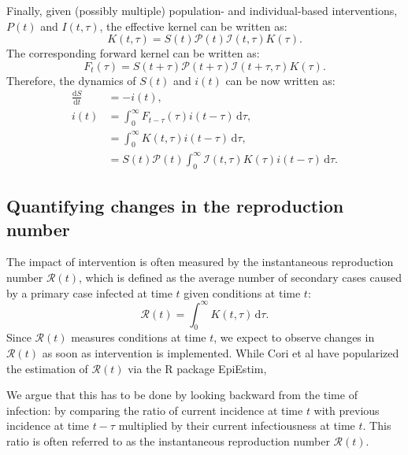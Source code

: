 \documentclass[12pt]{article}
\newcommand{\RR}{\ensuremath{{\mathcal R}}\xspace}
\newcommand{\dd}[1]{\ensuremath{\, \mathrm{d}#1}}
\newcommand{\dtau}{\dd{\tau}}
\newcommand{\PP}{{\mathcal P}}
\newcommand{\II}{{\mathcal I}}
\begin{document}
Finally, given (possibly multiple) population- and individual-based interventions, $P(t)$ and $I(t, \tau)$, the effective kernel can be written as:
\begin{equation}
K(t, \tau) = S(t) \PP(t) \II(t,\tau) K(\tau).
\end{equation}
The corresponding forward kernel can be written as:
\begin{equation}
F_t(\tau) = S(t+\tau) \PP(t + \tau) \II(t+\tau, \tau) K(\tau).
\end{equation}
Therefore, the dynamics of $S(t)$ and $i(t)$ can be now written as:
\begin{equation}
\begin{aligned}
\frac{\mathrm{d}S}{\mathrm{d}t} &= - i(t),\\
i(t) &= \int_0^\infty F_{t-\tau}(\tau) i(t-\tau) \dtau,\\
&=\int_0^\infty  K(t,\tau) i(t-\tau)\dtau,\\
&= S(t) \PP(t) \int_0^\infty \II(t, \tau) K(\tau) i(t-\tau)\dtau.
\end{aligned}
\end{equation}

\subsection{Quantifying changes in the reproduction number}

The impact of intervention is often measured by the instantaneous reproduction number $\RR(t)$, which is defined as the average number of secondary cases caused by a primary case infected at time $t$ given conditions at time $t$:
\begin{equation}
\RR(t) = \int_0^\infty K(t, \tau) \dtau.
\end{equation}
Since $\RR(t)$ measures conditions at time $t$, we expect to observe changes in $\RR(t)$ as soon as intervention is implemented.
While Cori et al have popularized the estimation of $\RR(t)$ via the R package EpiEstim, 


We argue that this has to be done by looking backward from the time of infection: by comparing the ratio of current incidence at time $t$ with previous incidence at time $t-\tau$ multiplied by their current infectiousness at time $t$.
This ratio is often referred to as the instantaneous reproduction number $\RR(t)$.
\end{document}
